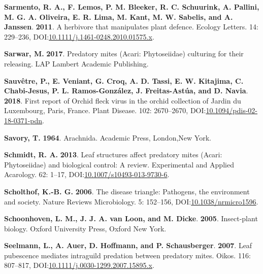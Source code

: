 \documentclass[12pt,final,CPage]{ufthesis}
\newlength{\cslhangindent}
\newenvironment{CSLReferences}[2] %
{%
	\setlength{\parindent}{0pt}
	\ifodd #1 \everypar{\setlength{\hangindent}{\cslhangindent}}\ignorespaces\fi
	\ifnum #2 > 0
	\setlength{\parskip}{#2\baselineskip}
	\fi
}%
{}
\begin{document}
{\begin{CSLReferences}{1}{0}
  \leavevmode{}%
  \textbf{Sarmento, R. A., F. Lemos, P. M. Bleeker, R. C. Schuurink, A. Pallini, M. G. A. Oliveira, E. R. Lima, M. Kant, M. W. Sabelis, and A. Janssen}. \textbf{2011}. A herbivore that manipulates plant defence. Ecology Letters. 14: 229--236, DOI:\href{https://doi.org/10.1111/j.1461-0248.2010.01575.x}{10.1111/j.1461-0248.2010.01575.x}.

  \leavevmode{}%
  \textbf{Sarwar, M.} \textbf{2017}. Predatory mites ({Acari}: {Phytoseiidae}) culturing for their releasing. LAP Lambert Academic Publishing.

  \leavevmode{}%
  \textbf{Sauvêtre, P., E. Veniant, G. Croq, A. D. Tassi, E. W. Kitajima, C. Chabi-Jesus, P. L. Ramos-González, J. Freitas-Astúa, and D. Navia}. \textbf{2018}. First report of {Orchid fleck virus} in the orchid collection of {Jardin du Luxembourg}, {Paris, France}. Plant Disease. 102: 2670--2670, DOI:\href{https://doi.org/10.1094/pdis-02-18-0371-pdn}{10.1094/pdis-02-18-0371-pdn}.

  \leavevmode{}%
  \textbf{Savory, T.} \textbf{1964}. Arachnida. Academic Press, London,New York.

  \leavevmode{}%
  \textbf{Schmidt, R. A.} \textbf{2013}. Leaf structures affect predatory mites ({Acari}: {Phytoseiidae}) and biological control: A review. Experimental and Applied Acarology. 62: 1--17, DOI:\href{https://doi.org/10.1007/s10493-013-9730-6}{10.1007/s10493-013-9730-6}.

  \leavevmode{}%
  \textbf{Scholthof, K.-B. G.} \textbf{2006}. The disease triangle: Pathogens, the environment and society. Nature Reviews Microbiology. 5: 152--156, DOI:\href{https://doi.org/10.1038/nrmicro1596}{10.1038/nrmicro1596}.

  \leavevmode{}%
  \textbf{Schoonhoven, L. M., J. J. A. van Loon, and M. Dicke}. \textbf{2005}. Insect-plant biology. Oxford University Press, Oxford New York.

  \leavevmode{}%
  \textbf{Seelmann, L., A. Auer, D. Hoffmann, and P. Schausberger}. \textbf{2007}. Leaf pubescence mediates intraguild predation between predatory mites. Oikos. 116: 807--817, DOI:\href{https://doi.org/10.1111/j.0030-1299.2007.15895.x}{10.1111/j.0030-1299.2007.15895.x}.


\end{CSLReferences}}
\end{document}
